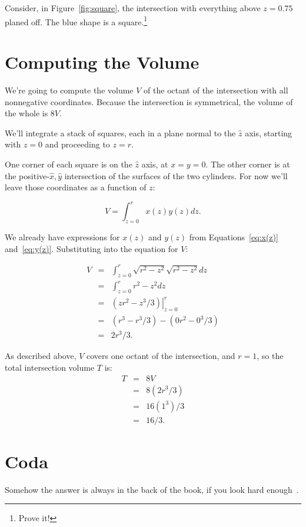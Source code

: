 \documentclass[twocolumn]{article}
\theoremstyle{definition}
\theoremstyle{plain}
\begin{document}
Consider, in Figure~\ref{fig:square}, the intersection with everything
above $z=0.75$ planed off.  The blue shape is a square.\footnote{Prove it!}

\section{Computing the Volume}
\label{sec:computing}

We're going to compute the volume $V$ of the octant of the
intersection with all nonnegative coordinates.  Because the
intersection is symmetrical, the volume of the whole is $8V$.

We'll integrate a stack of squares, each in a plane normal to the
$\hat{z}$ axis, starting with $z=0$ and proceeding to $z=r$.

One corner of each square is on the $\hat{z}$ axis, at $x=y=0$.  The
other corner is at the positive-$\hat{x},\hat{y}$ intersection of the
surfaces of the two cylinders.  For now we'll leave those coordinates
as a function of $z$:

\begin{equation*}
  V = \int_{z=0}^r x(z) y(z) dz.
\end{equation*}

We already have expressions for $x(z)$ and $y(z)$ from
Equations~\ref{eq:x(z)} and~\ref{eq:y(z)}.  Substituting into the
equation for $V$:

\begin{eqnarray*}
  V & = & \int_{z=0}^r \sqrt{r^2 - z^2} \sqrt{r^2 - z^2} dz \\
  & = & \int_{z=0}^r r^2 - z^2 dz \\
  & = & \left. (zr^2 - z^3/3) \right|_{z=0}^r \\
  & = & (r^3 - r^3/3) - (0r^2 - 0^3/3) \\
  & = & 2r^3/3.
\end{eqnarray*}

As described above, $V$ covers one octant of the intersection, and
$r=1$, so the total intersection volume $T$ is:
\begin{eqnarray*}
  T & = & 8V \\
  & = & 8(2r^3/3) \\
  & = & 16(1^3)/3 \\
  & = & 16/3.
\end{eqnarray*}

\section{Coda}

Somehow the answer is always in the back of the book, if you look hard
enough~\cite{Wikipedia-Steinmetz}.



\end{document}

